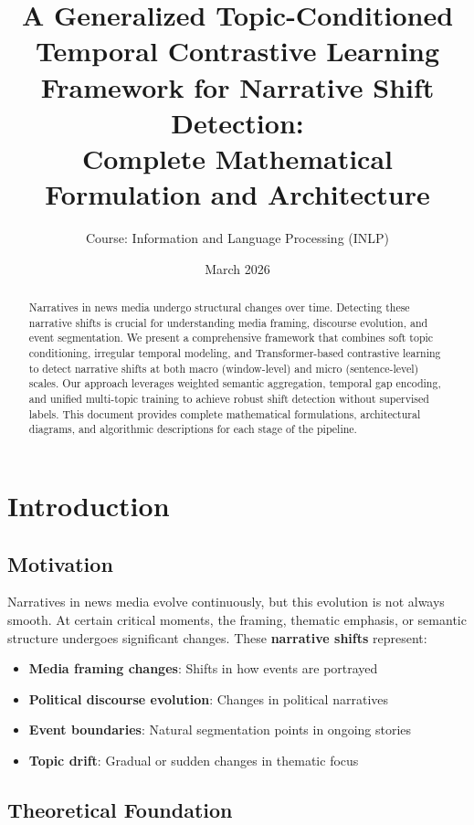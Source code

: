 \documentclass[12pt]{article}
\title{\textbf{A Generalized Topic-Conditioned Temporal Contrastive Learning Framework for Narrative Shift Detection: \\
\large Complete Mathematical Formulation and Architecture}}
\author{Course: Information and Language Processing (INLP)}
\date{March 2026}
\begin{document}
\maketitle

\begin{abstract}
Narratives in news media undergo structural changes over time. Detecting these narrative shifts is crucial for understanding media framing, discourse evolution, and event segmentation. We present a comprehensive framework that combines soft topic conditioning, irregular temporal modeling, and Transformer-based contrastive learning to detect narrative shifts at both macro (window-level) and micro (sentence-level) scales. Our approach leverages weighted semantic aggregation, temporal gap encoding, and unified multi-topic training to achieve robust shift detection without supervised labels. This document provides complete mathematical formulations, architectural diagrams, and algorithmic descriptions for each stage of the pipeline.
\end{abstract}

\tableofcontents
\newpage

\section{Introduction}

\subsection{Motivation}

Narratives in news media evolve continuously, but this evolution is not always smooth. At certain critical moments, the framing, thematic emphasis, or semantic structure undergoes significant changes. These \textbf{narrative shifts} represent:

\begin{itemize}[itemsep=0.5em]
    \item \textbf{Media framing changes}: Shifts in how events are portrayed
    \item \textbf{Political discourse evolution}: Changes in political narratives
    \item \textbf{Event boundaries}: Natural segmentation points in ongoing stories
    \item \textbf{Topic drift}: Gradual or sudden changes in thematic focus
\end{itemize}

\subsection{Theoretical Foundation}
\end{document}
